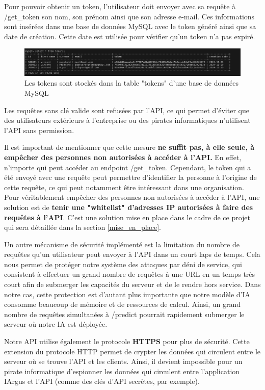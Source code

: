 \documentclass[french]{article}
\begin{document}
    Pour pouvoir obtenir un token, l'utilisateur doit envoyer avec sa requête à /get\_token son nom, son prénom ainsi que son adresse e-mail. Ces informations sont insérées dans une base de données MySQL avec le token généré ainsi que sa date de création. Cette date est utilisée pour vérifier qu'un token n'a pas expiré.

    \begin{figure}[h!]
        \includegraphics[width=12cm]{db_tokens}
        \centering
        \caption{Les tokens sont stockés dans la table "tokens" d'une base de données MySQL}
        \centering
    \end{figure}

    Les requêtes sans clé valide sont refusées par l'API, ce qui permet d'éviter que des utilisateurs extérieurs à l'entreprise ou des pirates informatiques n'utilisent l'API sans permission.

    Il est important de mentionner que cette mesure \textbf{ne suffit pas, à elle seule, à empêcher des personnes non autorisées à accéder à l'API.} En effet, n'importe qui peut accéder au endpoint /get\_token. Cependant, le token qui a été envoyé avec une requête peut permettre d'identifier la personne à l'origine de cette requête, ce qui peut notamment être intéressant dans une organisation. Pour véritablement empêcher des personnes non autorisées à accéder à l'API, une solution est de \textbf{tenir une "whitelist" d'adresses IP autorisées à faire des requêtes à l'API}. C'est une solution mise en place dans le cadre de ce projet qui sera détaillée dans la section \ref{mise_en_place}.


    Un autre mécanisme de sécurité implémenté est la limitation du nombre de requêtes qu'un utilisateur peut envoyer à l'API dans un court laps de temps. Cela nous permet de protéger notre système des attaques par déni de service, qui consistent à effectuer un grand nombre de requêtes à une URL en un temps très court afin de submerger les capacités du serveur et de le rendre hors service. Dans notre cas, cette protection est d'autant plus importante que notre modèle d'IA consomme beaucoup de mémoire et de ressources de calcul. Ainsi, un grand nombre de requêtes simultanées à /predict pourrait rapidement submerger le serveur où notre IA est déployée.

    Notre API utilise également le protocole \textbf{HTTPS} pour plus de sécurité. Cette extension du protocole HTTP permet de crypter les données qui circulent entre le serveur où se trouve l'API et les clients. Ainsi, il devient impossible pour un pirate informatique d'espionner les données qui circulent entre l'application IArgus et l'API (comme des clés d'API secrètes, par exemple).
\end{document}
